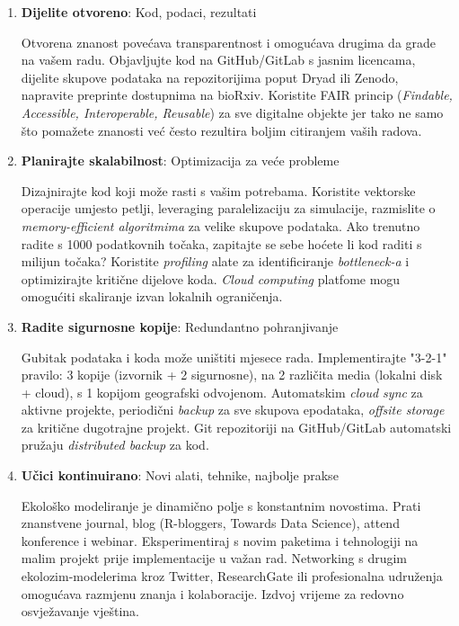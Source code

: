 \documentclass[11pt,oneside]{book}
\begin{document}
\begin{enumerate}
	\item \textbf{Dijelite otvoreno}: Kod, podaci, rezultati
	
	Otvorena znanost povećava transparentnost i omogućava drugima da grade na vašem radu. Objavljujte kod na GitHub/GitLab s jasnim licencama, dijelite skupove podataka na repozitorijima poput Dryad ili Zenodo, napravite preprinte dostupnima na bioRxiv. Koristite FAIR princip (\textit{Findable, Accessible, Interoperable, Reusable}) za sve digitalne objekte jer tako ne samo što pomažete znanosti već često rezultira boljim citiranjem vaših radova.
	
	\item \textbf{Planirajte skalabilnost}: Optimizacija za veće probleme
	
	Dizajnirajte kod koji može rasti s vašim potrebama. Koristite vektorske operacije umjesto petlji, leveraging paralelizaciju za simulacije, razmislite o \textit{memory-efficient algoritmima} za velike skupove podataka. Ako trenutno radite s 1000 podatkovnih točaka, zapitajte se  sebe hoćete li kod raditi s milijun točaka? Koristite \textit{profiling} alate za identificiranje \textit{bottleneck-a} i optimizirajte kritične dijelove koda. \textit{Cloud computing} platfome mogu omogućiti skaliranje izvan lokalnih ograničenja.
	
	\item \textbf{Radite sigurnosne kopije}: Redundantno pohranjivanje
	
	Gubitak podataka i koda može uništiti mjesece rada. Implementirajte "3-2-1" pravilo: 3 kopije (izvornik + 2 sigurnosne), na 2 različita media (lokalni disk + cloud), s 1 kopijom geografski odvojenom. Automatskim \textit{cloud sync} za aktivne projekte, periodični \textit{backup} za sve skupova epodataka, \textit{offsite storage} za kritične dugotrajne projekt. Git repozitoriji na GitHub/GitLab automatski pružaju \textit{distributed backup} za kod.
	
	\item \textbf{Učici kontinuirano}: Novi alati, tehnike, najbolje prakse
	
	Ekološko modeliranje je dinamično polje s konstantnim novostima. Prati znanstvene journal, blog (R-bloggers, Towards Data Science), attend konference i webinar. Eksperimentiraj s novim paketima i tehnologiji na malim projekt prije implementacije u važan rad. Networking s drugim ekolozim-modelerima kroz Twitter, ResearchGate ili profesionalna udruženja omogućava razmjenu znanja i kolaboracije. Izdvoj vrijeme za redovno osvježavanje vještina.
	
\end{enumerate}
	
\end{document}
